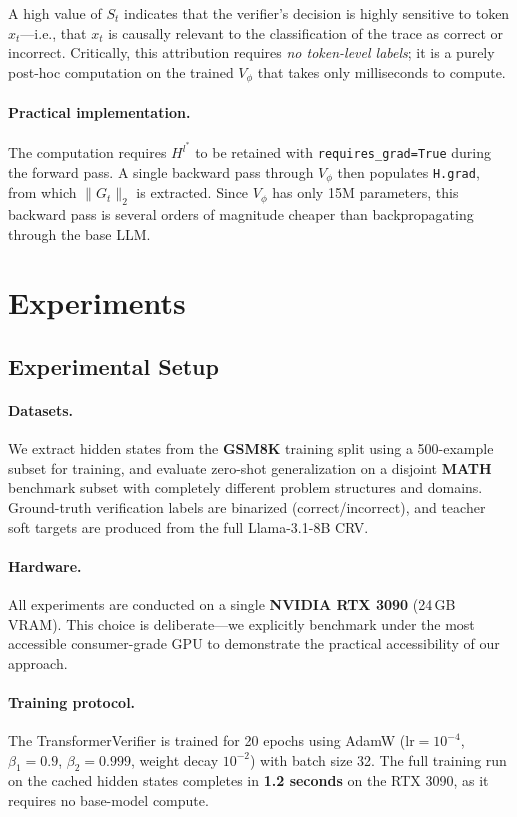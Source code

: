 \documentclass{article}
\begin{document}
A high value of $S_t$ indicates that the verifier's decision is highly sensitive to token $x_t$---i.e., that $x_t$ is causally relevant to the classification of the trace as correct or incorrect. Critically, this attribution requires \emph{no token-level labels}; it is a purely post-hoc computation on the trained $V_\phi$ that takes only milliseconds to compute.

\paragraph{Practical implementation.} The computation requires $H^{l^*}$ to be retained with \texttt{requires\_grad=True} during the forward pass. A single backward pass through $V_\phi$ then populates \texttt{H.grad}, from which $\|G_t\|_2$ is extracted. Since $V_\phi$ has only 15M parameters, this backward pass is several orders of magnitude cheaper than backpropagating through the base LLM.

\section{Experiments}
\label{sec:experiments}

\subsection{Experimental Setup}
\label{sec:setup}

\paragraph{Datasets.} We extract hidden states from the \textbf{GSM8K} training split \citep{cobbe2021training} using a 500-example subset for training, and evaluate zero-shot generalization on a disjoint \textbf{MATH} benchmark subset with completely different problem structures and domains. Ground-truth verification labels are binarized (correct/incorrect), and teacher soft targets are produced from the full Llama-3.1-8B CRV.

\paragraph{Hardware.} All experiments are conducted on a single \textbf{NVIDIA RTX 3090} (24\,GB VRAM). This choice is deliberate---we explicitly benchmark under the most accessible consumer-grade GPU to demonstrate the practical accessibility of our approach.

\paragraph{Training protocol.} The TransformerVerifier is trained for 20 epochs using AdamW ($\text{lr}=10^{-4}$, $\beta_1=0.9$, $\beta_2=0.999$, weight decay $10^{-2}$) with batch size 32. The full training run on the cached hidden states completes in \textbf{1.2 seconds} on the RTX 3090, as it requires no base-model compute.
\end{document}
